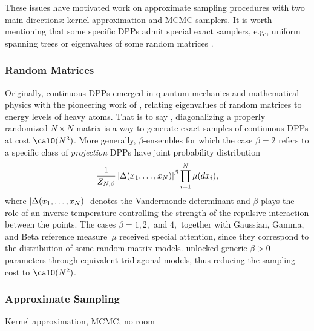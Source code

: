 \documentclass[twoside,11pt]{article}
\begin{document}
      These issues have motivated work on approximate sampling procedures with two main directions: kernel approximation and MCMC samplers.
      It is worth mentioning that some specific DPPs admit special exact samplers, e.g., uniform spanning trees \citep{PrWi98} or eigenvalues of some random matrices \citep{DuEd02}.


    \subsubsection{Random Matrices} %
    \label{ssub:random_matrices}

      Originally, continuous DPPs emerged in quantum mechanics and mathematical physics with the pioneering work of \citet{Wig67}, relating eigenvalues of random matrices to energy levels of heavy atoms.
      That is to say , diagonalizing a properly randomized $N\times N$ matrix is a way to generate exact samples of continuous DPPs at cost $\calO(N^3)$.
      More generally, $\beta$-ensembles for which the case $\beta=2$ refers to a specific class of \textit{projection} DPPs \citep{Kon05} have joint probability distribution
      \begin{equation}
        \frac{1}{Z_{N,\beta}}
        \left| \Delta(x_1,\dots,x_N) \right|^{\beta}
        \prod_{i= 1}^N
          \mu(d x_i),
      \end{equation}
      where $\left| \Delta(x_1,\dots,x_N) \right|$ denotes the Vandermonde determinant and $\beta$ plays the role of an inverse temperature controlling the strength of the repulsive interaction between the points.
      The cases $\beta=1, 2,$ and $4,$ together with Gaussian, Gamma, and Beta reference measure~$\mu$ received special attention, since they correspond to the distribution of some random matrix models.
      \citet{DuEd02} unlocked generic $\beta>0$ parameters through equivalent tridiagonal models, thus reducing the sampling cost to $\calO(N^2)$.


    \subsubsection{Approximate Sampling} %
    \label{ssub:approximate_sampling}

      Kernel approximation, MCMC, no room

\end{document}
